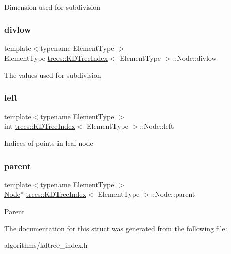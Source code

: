 Dimension used for subdivision \mbox{\label{structtrees_1_1_k_d_tree_index_1_1_node_aa80b732e6a6da3c9d43b09efdf949a06}} 
\subsubsection{\texorpdfstring{divlow}{divlow}}
{\footnotesize\ttfamily template$<$typename Element\+Type $>$ \\
Element\+Type \hyperlink{classtrees_1_1_k_d_tree_index}{trees\+::\+K\+D\+Tree\+Index}$<$ Element\+Type $>$\+::Node\+::divlow}

The values used for subdivision \mbox{\label{structtrees_1_1_k_d_tree_index_1_1_node_aae063499d92e644cfc075f9c151b185b}} 
\subsubsection{\texorpdfstring{left}{left}}
{\footnotesize\ttfamily template$<$typename Element\+Type $>$ \\
int \hyperlink{classtrees_1_1_k_d_tree_index}{trees\+::\+K\+D\+Tree\+Index}$<$ Element\+Type $>$\+::Node\+::left}

Indices of points in leaf node \mbox{\label{structtrees_1_1_k_d_tree_index_1_1_node_a987f89ac48760137312cf2aca0ca8b14}} 
\subsubsection{\texorpdfstring{parent}{parent}}
{\footnotesize\ttfamily template$<$typename Element\+Type $>$ \\
\hyperlink{structtrees_1_1_k_d_tree_index_1_1_node}{Node}$\ast$ \hyperlink{classtrees_1_1_k_d_tree_index}{trees\+::\+K\+D\+Tree\+Index}$<$ Element\+Type $>$\+::Node\+::parent}

Parent 

The documentation for this struct was generated from the following file\+:\begin{DoxyCompactItemize}
\item 
algorithms/kdtree\+\_\+index.\+h\end{DoxyCompactItemize}
